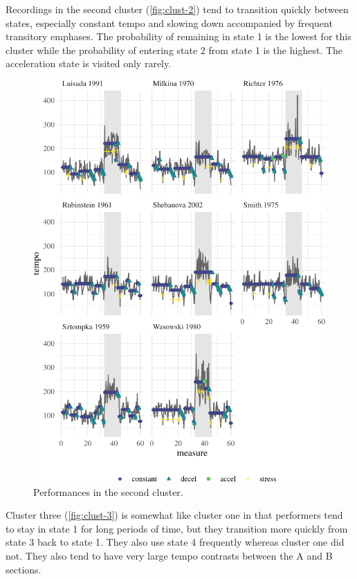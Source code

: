 \documentclass[aoas]{aoas/imsart}
\begin{document}
Recordings in the second cluster (\autoref{fig:clust-2}) tend to
transition quickly between states, especially constant tempo and slowing
down accompanied by frequent transitory emphases. The probability of
remaining in state 1 is the lowest for this cluster while the
probability of entering state 2 from state 1 is the highest. The
acceleration state is visited only rarely.

\begin{figure}

{\centering \includegraphics{gfx/clust-2-1} 

}

\caption{Performances in the second cluster.}\label{fig:clust-2}
\end{figure}

Cluster three (\autoref{fig:clust-3}) is somewhat like cluster one in
that performers tend to stay in state 1 for long periods of time, but
they transition more quickly from state 3 back to state 1. They also use
state 4 frequently whereas cluster one did not. They also tend to have
very large tempo contrasts between the A and B sections.
\end{document}
